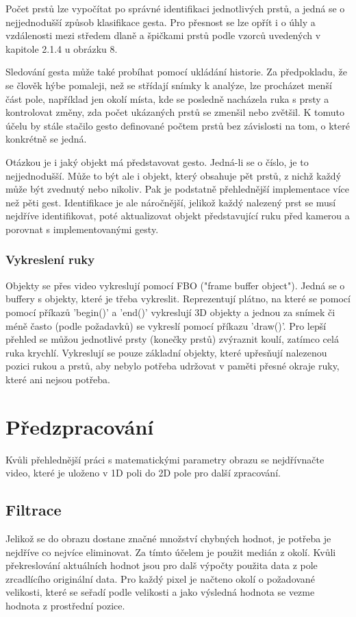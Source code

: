 Počet prstů lze vypočítat po správné identifikaci jednotlivých prstů, a jedná se o nejjednodušší způsob klasifikace gesta. Pro přesnost se lze opřít i o úhly a vzdálenosti mezi středem dlaně a špičkami prstů podle vzorců uvedených v kapitole 2.1.4 u obrázku 8.

Sledování gesta může také probíhat pomocí ukládání historie. Za předpokladu, že se člověk hýbe pomaleji, než se střídají snímky k analýze, lze procházet menší část pole, například jen okolí místa, kde se posledně nacházela ruka s prsty a kontrolovat změny, zda počet ukázaných prstů se zmenšil nebo zvětšil. K tomuto účelu by stále stačilo gesto definované počtem prstů bez závislosti na tom, o které konkrétně se jedná.

Otázkou je i jaký objekt má představovat gesto. Jedná-li se o číslo, je to nejjednodušší. Může to být ale i objekt, který obsahuje pět prstů, z nichž každý může být zvednutý nebo nikoliv. Pak je podstatně přehlednější implementace více než pěti gest. Identifikace je ale náročnější, jelikož každý nalezený prst se musí nejdříve identifikovat, poté aktualizovat objekt představující ruku před kamerou a porovnat s implementovanými gesty. 

\subsubsection{Vykreslení ruky}
Objekty se přes video vykreslují pomocí FBO ("frame buffer object"). Jedná se o buffery s objekty, které je třeba vykreslit. Reprezentují plátno, na které se pomocí pomocí příkazů 'begin()' a 'end()' vykreslují 3D objekty a jednou za snímek či méně často (podle požadavků) se vykreslí pomocí příkazu 'draw()'. Pro lepší přehled se můžou jednotlivé prsty (konečky prstů) zvýraznit koulí, zatímco celá ruka krychlí. Vykreslují se pouze základní objekty, které upřesňují nalezenou pozici rukou a prstů, aby nebylo potřeba udržovat v paměti přesné okraje ruky, které ani nejsou potřeba.

\section{Předzpracování}

Kvůli přehlednější práci s matematickými parametry obrazu se nejdřívnačte video, které je uloženo v 1D poli do 2D pole pro další zpracování.\\

\subsection{Filtrace}
Jelikož se do obrazu dostane značné množství chybných hodnot, je potřeba je nejdříve co nejvíce eliminovat. Za tímto účelem je použit medián z okolí. Kvůli překreslování aktuálních hodnot jsou pro dalš výpočty použita data z pole zrcadlícího originální data. Pro každý pixel je načteno okolí o požadované velikosti, které se seřadí podle velikosti a jako výsledná hodnota se vezme hodnota z prostřední pozice.\\

